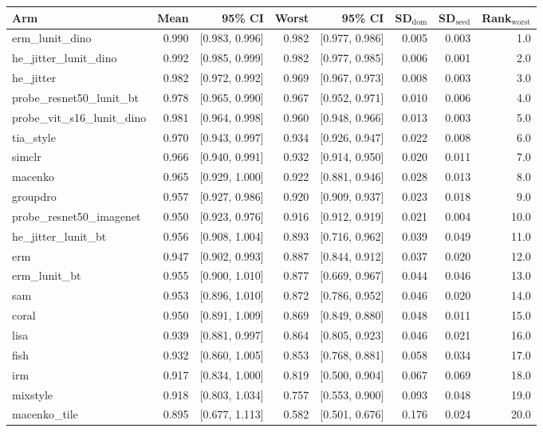 \begin{tabular}{lrrrrrrr}
\toprule
Arm & Mean & 95\% CI & Worst & 95\% CI & SD$_\text{dom}$ & SD$_\text{seed}$ & Rank$_\text{worst}$ \\
\midrule
erm\_lunit\_dino & 0.990 & [0.983, 0.996] & 0.982 & [0.977, 0.986] & 0.005 & 0.003 & 1.0 \\
he\_jitter\_lunit\_dino & 0.992 & [0.985, 0.999] & 0.982 & [0.977, 0.985] & 0.006 & 0.001 & 2.0 \\
he\_jitter & 0.982 & [0.972, 0.992] & 0.969 & [0.967, 0.973] & 0.008 & 0.003 & 3.0 \\
probe\_resnet50\_lunit\_bt & 0.978 & [0.965, 0.990] & 0.967 & [0.952, 0.971] & 0.010 & 0.006 & 4.0 \\
probe\_vit\_s16\_lunit\_dino & 0.981 & [0.964, 0.998] & 0.960 & [0.948, 0.966] & 0.013 & 0.003 & 5.0 \\
tia\_style & 0.970 & [0.943, 0.997] & 0.934 & [0.926, 0.947] & 0.022 & 0.008 & 6.0 \\
simclr & 0.966 & [0.940, 0.991] & 0.932 & [0.914, 0.950] & 0.020 & 0.011 & 7.0 \\
macenko & 0.965 & [0.929, 1.000] & 0.922 & [0.881, 0.946] & 0.028 & 0.013 & 8.0 \\
groupdro & 0.957 & [0.927, 0.986] & 0.920 & [0.909, 0.937] & 0.023 & 0.018 & 9.0 \\
probe\_resnet50\_imagenet & 0.950 & [0.923, 0.976] & 0.916 & [0.912, 0.919] & 0.021 & 0.004 & 10.0 \\
he\_jitter\_lunit\_bt & 0.956 & [0.908, 1.004] & 0.893 & [0.716, 0.962] & 0.039 & 0.049 & 11.0 \\
erm & 0.947 & [0.902, 0.993] & 0.887 & [0.844, 0.912] & 0.037 & 0.020 & 12.0 \\
erm\_lunit\_bt & 0.955 & [0.900, 1.010] & 0.877 & [0.669, 0.967] & 0.044 & 0.046 & 13.0 \\
sam & 0.953 & [0.896, 1.010] & 0.872 & [0.786, 0.952] & 0.046 & 0.020 & 14.0 \\
coral & 0.950 & [0.891, 1.009] & 0.869 & [0.849, 0.880] & 0.048 & 0.011 & 15.0 \\
lisa & 0.939 & [0.881, 0.997] & 0.864 & [0.805, 0.923] & 0.046 & 0.021 & 16.0 \\
fish & 0.932 & [0.860, 1.005] & 0.853 & [0.768, 0.881] & 0.058 & 0.034 & 17.0 \\
irm & 0.917 & [0.834, 1.000] & 0.819 & [0.500, 0.904] & 0.067 & 0.069 & 18.0 \\
mixstyle & 0.918 & [0.803, 1.034] & 0.757 & [0.553, 0.900] & 0.093 & 0.048 & 19.0 \\
macenko\_tile & 0.895 & [0.677, 1.113] & 0.582 & [0.501, 0.676] & 0.176 & 0.024 & 20.0 \\
\bottomrule
\end{tabular}
